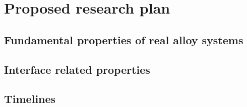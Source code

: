 \chapter{Proposed research plan}

\section{Fundamental properties of real alloy systems}

\section{Interface related properties}

\section{Timelines}
